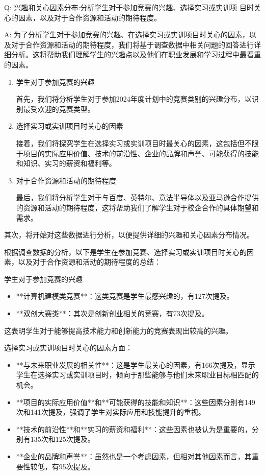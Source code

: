 Q:
  兴趣和关心因素分布:分析学生对于参加竞赛的兴趣、选择实习或实训项 目时关心的因素，以及对于合作资源和活动的期待程度。

A:
为了分析学生对于参加竞赛的兴趣、在选择实习或实训项目时关心的因素，以及对于合作资源和活动的期待程度，我们将基于调查数据中相关问题的回答进行详细分析。这将帮助我们理解学生的兴趣点以及他们在职业发展和学习过程中最看重的因素。
\begin{enumerate}
\item 学生对于参加竞赛的兴趣

首先，我们将分析学生对于参加2024年度计划中的竞赛类别的兴趣分布，以识别最受欢迎的竞赛类型。

\item 选择实习或实训项目时关心的因素

接着，我们将探究学生在选择实习或实训项目时最关心的因素，这包括但不限于项目的实际应用价值、技术的前沿性、企业的品牌和声誉、可能获得的技能和知识、实习的薪资和福利等。

\item 对于合作资源和活动的期待程度

最后，我们将分析学生对于与百度、英特尔、意法半导体以及亚马逊合作提供的资源和活动的期待程度，这将帮助我们了解学生对于校企合作的具体期望和需求。
\end{enumerate}

其次，将开始对这些数据进行分析，以便提供详细的兴趣和关心因素分布情况。

根据调查数据的分析，以下是学生在参加竞赛、选择实习或实训项目时关心的因素，以及对于合作资源和活动的期待程度的总结：

学生对于参加竞赛的兴趣
\begin{itemize}
\item  **计算机建模类竞赛**：这类竞赛是学生最感兴趣的，有127次提及。
\item  **双创大赛类**：其次是创新创业相关的竞赛，有73次提及。
\end{itemize}
这表明学生对于能够提高技术能力和创新能力的竞赛表现出较高的兴趣。

选择实习或实训项目时关心的因素方面：
\begin{itemize}
\item **与未来职业发展的相关性**：这是学生最关心的因素，有166次提及，显示学生在选择实习或实训项目时，倾向于那些能够与他们未来职业目标相匹配的机会。
\item **项目的实际应用价值**和**可能获得的技能和知识**：这些因素分别有149次和141次提及，强调了学生对实际应用和技能提升的重视。
\item **技术的前沿性**和**实习的薪资和福利**：这些因素也被认为是重要的，分别有135次和125次提及。
\item **企业的品牌和声誉**：虽然也是一个考虑因素，但相对其他因素而言，其重要性较低，有95次提及。
\end{itemize}

